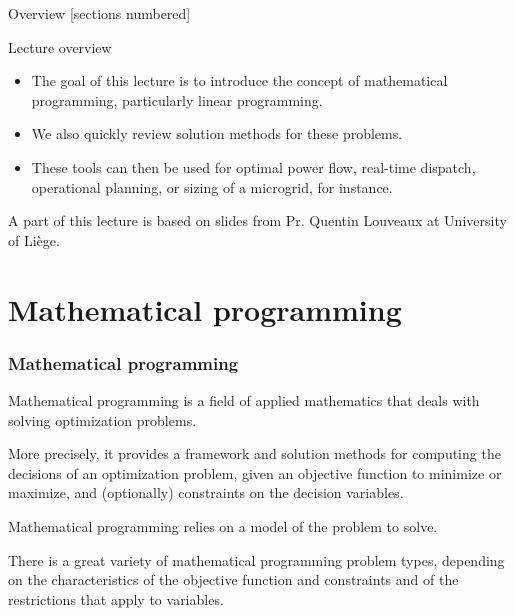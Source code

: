 \titleframe

\begin{frame}{Overview}
  [sections numbered]
  \tableofcontents[hideallsubsections]
\end{frame}

\begin{frame} {Lecture overview}
\begin{itemize}
\item The goal of this lecture is to introduce the concept of mathematical programming, particularly linear programming.
\item We also quickly review solution methods for these problems.
\item These tools can then be used for optimal power flow, real-time dispatch, operational planning, or sizing of a microgrid, for instance.
\end{itemize}

 A part of this lecture is based on slides from Pr. Quentin Louveaux at University of Liège.

\end{frame}


\section{Mathematical programming}
\begin{frame} \frametitle{Mathematical programming}
Mathematical programming is a field of applied mathematics that deals with solving optimization problems. 

\vfill

More precisely, it provides a framework and solution methods for computing the \alert{decisions} of an optimization problem, given an \alert{objective function} to minimize or maximize, and (optionally) \alert{constraints} on the decision variables.

\vfill 
Mathematical programming relies on a model of the problem to solve.

\vfill

There is a great variety of mathematical programming problem types, depending on the characteristics of the objective function and constraints and of the restrictions that apply to variables.
	
\end{frame}

